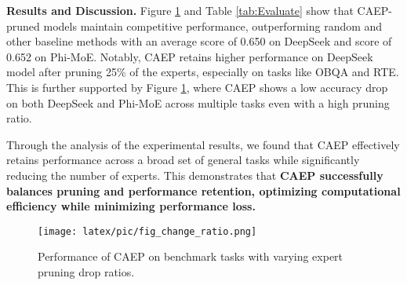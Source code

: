\documentclass[11pt]{article}
\begin{document}
\textbf{Results and Discussion.} Figure \ref{fig:benchmark_comparison} and Table \ref{tab:Evaluate} show that CAEP-pruned models maintain competitive performance, outperforming random and other baseline methods with an average score of 0.650 on DeepSeek and score of 0.652 on Phi-MoE. Notably, CAEP retains higher performance on DeepSeek model after pruning 25\% of the experts, especially on tasks like OBQA and RTE. This is further supported by Figure \ref{fig:benchmark_comparison}, where CAEP shows a low accuracy drop on both DeepSeek and Phi-MoE across multiple tasks even with a high pruning ratio.


Through the analysis of the experimental results, we found that CAEP effectively retains performance across a broad set of general tasks while significantly reducing the number of experts. This demonstrates that \textbf{CAEP successfully balances pruning and performance retention, optimizing computational efficiency while minimizing performance loss.} 
\begin{figure}[ht]
    \centering
    \texttt{[image: latex/pic/fig\_change\_ratio.png]}
    \caption{Performance of CAEP on benchmark tasks with varying expert pruning drop ratios.}
    \label{fig:benchmark_comparison}
\end{figure}




\renewcommand{\arraystretch}{1.2} 

\useunder{\uline}{\ul}{}


\end{document}
